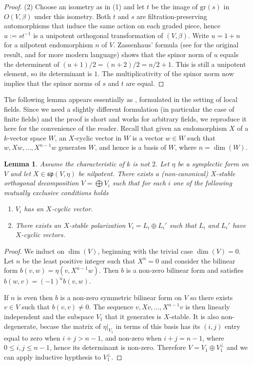 \documentclass{article}
\def\mf#1{\mathfrak{#1}}
\newtheorem{lem}[thm]{Lemma}
\theoremstyle{definition}
\numberwithin{equation}{subsection}
\renewcommand{\-}{\hyp{}}
\begin{document}
\begin{appendices}
\begin{proof}
	(2) Choose an isometry as in (1) and let $t$ be the image of $\mathrm{gr}(s)$ in $O(V,\beta)$ under this isometry. Both $t$ and $s$ are filtration-preserving automorphisms that induce the same action on each graded piece, hence $u:=st^{-1}$ is a unipotent orthogonal transformation of $(V,\beta)$. Write $u=1+n$ for a nilpotent endomorphism $n$ of $V$. Zassenhaus' formula (see \cite[\S2]{Zass1962} for the original result, and \cite[Theorem 3.5]{CT2020} for more modern language) shows that the spinor norm of $u$ equals the determinent of $(u+1)/2=(n+2)/2=n/2+1$. This is still a unipotent element, so its determinant is $1$. The multiplicativity of the spinor norm now implies that the spinor norms of $s$ and $t$ are equal.
\end{proof}

The following lemma appears essentially as \cite[Proposition 2.15]{Mezer2023}, formulated in the setting of local fields. Since we need a slightly different formulation (in particular the case of finite fields) and the proof is short and works for arbitrary fields, we reproduce it here for the convenience of the reader. Recall that given an endomorphism $X$ of a $k$-vector space $W$, an $X$-cyclic vector in $W$ is a vector $w \in W$ such that $w,Xw,\dots,X^{n-1}w$ generates $W$, and hence is a basis of $W$, where $n=\dim(W)$.

\begin{lem} \label{lem:spnormal}
	Assume the characteristic of $k$ is not $2$. Let $\eta$ be a symplectic form on $V$ and let $X \in \mf{sp}(V,\eta)$ be nilpotent. There exists a (non-canonical) $X$-stable orthogonal decomposition $V=\bigoplus V_i$ such that for each $i$ one of the following mutually exclusive conditions holds
	\begin{enumerate}
		\item $V_i$ has an $X$-cyclic vector.
		\item There exists an $X$-stable polarization $V_i=L_i \oplus L_i'$ such that $L_i$ and $L_i'$ have $X$-cyclic vectors.
	\end{enumerate}
\end{lem}
\begin{proof}
	We induct on $\dim(V)$, beginning with the trivial case $\dim(V)=0$. Let $n$ be the least positive integer such that $X^n=0$ and consider the bilinear form $b(v,w)=\eta(v,X^{n-1}w)$. Then $b$ is a non-zero bilinear form and satisfies $b(w,v)=(-1)^n b(v,w)$. 
	
	If $n$ is even then $b$ is a non-zero symmetric bilinear form on $V$ so there exists $v \in V$ such that $b(v,v) \neq 0$. The sequence $v,Xv,\dots,X^{n-1}v$ is then linearly independent and the subspace $V_1$ that it generates is $X$-stable. It is also non-degenerate, becase the matrix of $\eta|_{V_1}$ in terms of this basis has its $(i,j)$ entry equal to zero when $i+j>n-1$, and non-zero when $i+j=n-1$, where $0 \leq i,j \leq n-1$, hence its determinant is non-zero. Therefore $V=V_1 \oplus V_1^\perp$ and we can apply inductive hypthesis to $V_1^\perp$.


\end{proof}
\end{appendices}
\end{document}
